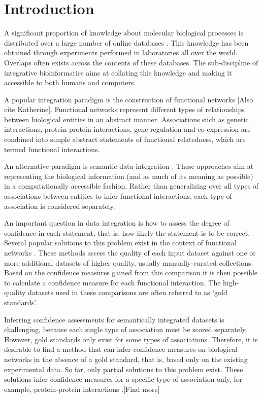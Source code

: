 \documentclass{bioinfo}
\newcommand{\note}[1]{{\color{red}[#1]}}
\begin{document}
\section{Introduction} 

A significant proportion of knowledge about molecular biological processes is distributed over a large number of online databases \citep{stein_creating_2002}. This knowledge has been obtained through experiments performed in laboratories all over the world. Overlaps often exists across the contents of these databases. The sub-discipline of integrative bioinformatics aims at collating this knowledge and making it accessible to both humans and computers. 

A popular integration paradigm is the construction of functional networks \citep{von_mering_string:_2003,warde-farley_genemania_2010}\note{Also cite Katherine}. Functional networks represent different types of relationships between biological entities in an abstract manner. Associations such as genetic interactions, protein-protein interactions, gene regulation and co-expression are combined into simple abstract statements of functional relatedness, which are termed functional interactions.

An alternative paradigm is semantic data integration \citep{cheung_yeasthub:_2005,smith_obo_2007,koehler_graph-based_2006}. These approaches aim at representing the biological information (and as much of its meaning as possible) in a computationally accessible fashion. Rather than generalizing over all types of associations between entities to infer functional interactions, each type of association is considered separately.

An important question in data integration is how to assess the degree of confidence in each statement, that is, how likely the statement is to be correct. Several popular solutions to this problem exist in the context of functional networks \citep{lee_probabilistic_2004,troyanskaya_bayesian_2003}.
These methods assess the quality of each input dataset against one or more additional datasets of higher quality, usually manually-curated collections. Based on the confidence measures gained from this comparison it is then possible to calculate a confidence measure for each functional interaction. The high-quality datasets used in these comparisons are often referred to as `gold standards'. 

Inferring confidence assessments for semantically integrated datasets is challenging, because each single type of association must be scored separately. However, gold standards only exist for some types of associations. Therefore, it is desirable to find a method that can infer confidence measures on biological networks in the absence of a gold standard, that is, based only on the existing experimental data. So far, only partial solutions to this problem exist. These solutions infer confidence measures for a specific type of association only, for example, protein-protein interactions \citep{bader_gaining_2004}.\note{Find more}
\end{document}

